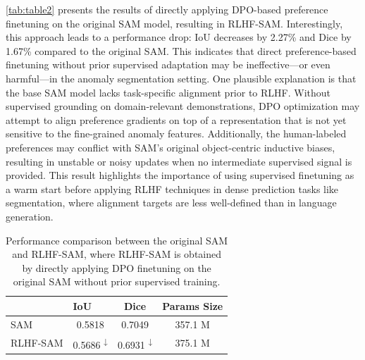 \documentclass[11pt]{article}
\begin{document}



\autoref{tab:table2} presents the results of directly applying DPO-based preference finetuning on the original SAM model, resulting in RLHF-SAM. Interestingly, this approach leads to a performance drop: IoU decreases by 2.27\% and Dice by 1.67\% compared to the original SAM. This indicates that direct preference-based finetuning without prior supervised adaptation may be ineffective—or even harmful—in the anomaly segmentation setting. One plausible explanation is that the base SAM model lacks task-specific alignment prior to RLHF. Without supervised grounding on domain-relevant demonstrations, DPO optimization may attempt to align preference gradients on top of a representation that is not yet sensitive to the fine-grained anomaly features. Additionally, the human-labeled preferences may conflict with SAM’s original object-centric inductive biases, resulting in unstable or noisy updates when no intermediate supervised signal is provided. This result highlights the importance of using supervised finetuning as a warm start before applying RLHF techniques in dense prediction tasks like segmentation, where alignment targets are less well-defined than in language generation.

\begin{table}[htbp]
  \centering
  \caption{Performance comparison between the original SAM and RLHF-SAM, where RLHF-SAM is obtained by directly applying DPO finetuning on the original SAM without prior supervised training.}
    \begin{tabular}{lccc}
    \toprule
          & \multicolumn{1}{l}{IoU} & Dice & Params Size \\
    \midrule
    SAM  & 0.5818  & 0.7049 & 357.1 M \\
    RLHF-SAM & 0.5686 \textsuperscript{↓} & 0.6931 \textsuperscript{↓} & 375.1 M \\
    \bottomrule
    \end{tabular}%
  \label{tab:table2}%
\end{table}%
\end{document}

